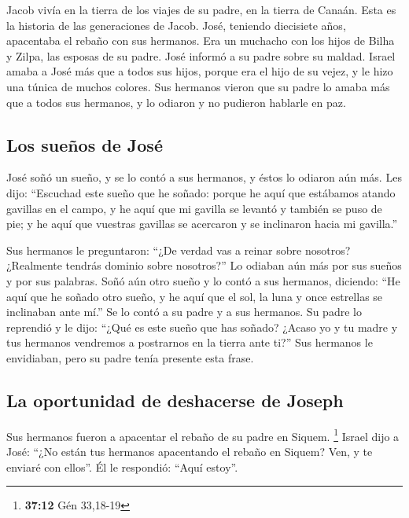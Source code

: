  Jacob vivía en la tierra de los viajes de su padre, en la
tierra de Canaán.  Esta es la historia de las generaciones
de Jacob. José, teniendo diecisiete años, apacentaba el rebaño con sus
hermanos. Era un muchacho con los hijos de Bilha y Zilpa, las esposas de
su padre. José informó a su padre sobre su maldad.  Israel
amaba a José más que a todos sus hijos, porque era el hijo de su vejez,
y le hizo una túnica de muchos colores.  Sus hermanos
vieron que su padre lo amaba más que a todos sus hermanos, y lo odiaron
y no pudieron hablarle en paz.

\hypertarget{los-sueuxf1os-de-josuxe9}{%
\subsection{Los sueños de José}\label{los-sueuxf1os-de-josuxe9}}

 José soñó un sueño, y se lo contó a sus hermanos, y éstos
lo odiaron aún más.  Les dijo: ``Escuchad este sueño que
he soñado:  porque he aquí que estábamos atando gavillas
en el campo, y he aquí que mi gavilla se levantó y también se puso de
pie; y he aquí que vuestras gavillas se acercaron y se inclinaron hacia
mi gavilla.''

 Sus hermanos le preguntaron: ``¿De verdad vas a reinar
sobre nosotros? ¿Realmente tendrás dominio sobre nosotros?'' Lo odiaban
aún más por sus sueños y por sus palabras.  Soñó aún otro
sueño y lo contó a sus hermanos, diciendo: ``He aquí que he soñado otro
sueño, y he aquí que el sol, la luna y once estrellas se inclinaban ante
mí.''  Se lo contó a su padre y a sus hermanos. Su padre
lo reprendió y le dijo: ``¿Qué es este sueño que has soñado? ¿Acaso yo y
tu madre y tus hermanos vendremos a postrarnos en la tierra ante ti?''
 Sus hermanos le envidiaban, pero su padre tenía presente
esta frase.

\hypertarget{la-oportunidad-de-deshacerse-de-joseph}{%
\subsection{La oportunidad de deshacerse de
Joseph}\label{la-oportunidad-de-deshacerse-de-joseph}}

 Sus hermanos fueron a apacentar el rebaño de su padre en
Siquem. \footnote{\textbf{37:12} Gén 33,18-19}  Israel
dijo a José: ``¿No están tus hermanos apacentando el rebaño en Siquem?
Ven, y te enviaré con ellos''. Él le respondió: ``Aquí estoy''.

